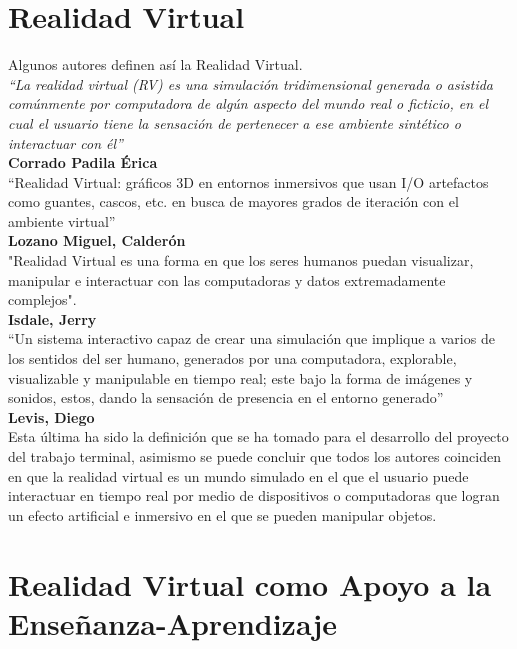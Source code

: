 \section{Realidad Virtual}
Algunos autores definen así la Realidad Virtual.\\
\newline
\textit{“La realidad virtual (RV) es una simulación tridimensional generada o asistida comúnmente por computadora de algún aspecto del mundo real o ficticio, en el cual 
el usuario tiene la sensación de pertenecer a ese ambiente sintético o interactuar con él”}\cite{web6}\\ 
\textbf{Corrado Padila Érica}\\
\newline
“Realidad Virtual: gráficos 3D en entornos inmersivos que usan I/O
artefactos como guantes, cascos, etc. en busca de mayores grados de iteración
con el ambiente virtual”\cite{web7}\\ 
\textbf{Lozano Miguel, Calderón}\\
\newline
"Realidad Virtual es una forma en que los seres humanos puedan
visualizar, manipular e interactuar con las computadoras y datos extremadamente
complejos".\cite{web8}\\
\textbf{Isdale, Jerry}\\
\newline
“Un sistema interactivo capaz de crear una simulación que implique a varios de los sentidos del ser humano, generados por una computadora, explorable, visualizable y manipulable 
en tiempo real; este bajo la forma de imágenes y sonidos, estos, dando la sensación de presencia en el entorno generado”\cite{web9}\\
\textbf{Levis, Diego}\\
\newline
Esta última ha sido la definición que se ha tomado para el desarrollo del proyecto del trabajo terminal, asimismo se puede concluir que todos los autores coinciden en que la 
realidad virtual es un mundo simulado en el que el usuario puede interactuar en tiempo real por medio
de dispositivos o computadoras que logran un efecto artificial e inmersivo en el que se pueden manipular objetos.

\section{Realidad Virtual como Apoyo a la Enseñanza-Aprendizaje}

